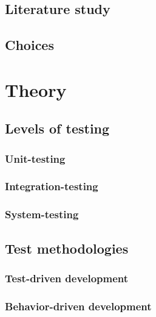 \documentclass[a4paper]{report}
\begin{document}
  \section{Literature study}
  

  \section{Choices}
  


\chapter{Theory}
\label{chap:theory}

  \section{Levels of testing}

    \subsection{Unit-testing}
    \label{sec:unit_testing}
    

    \subsection{Integration-testing}
    \label{sec:integration_testing}
    

    \subsection{System-testing}
    


  \section{Test methodologies}
    \subsection{Test-driven development}
    \label{sec:tdd}
    

    \subsection{Behavior-driven development}
    
\end{document}
